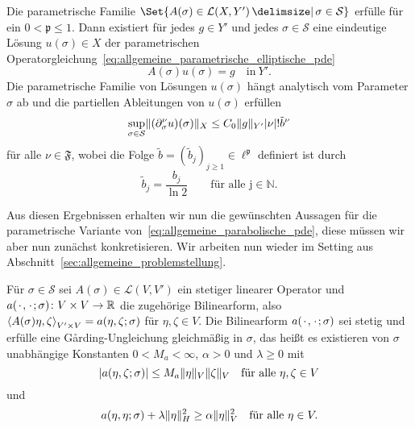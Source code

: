 \begin{Satz}
\label{thm:kunoth:theorem4}
    Die parametrische Familie $\Set{ A(\sigma) \in \mathcal L(X, Y') \given \sigma \in \mathcal S }$ erfülle  für ein $0 < \mathfrak p \leq 1$.
    Dann existiert für jedes $g \in Y'$ und jedes $\sigma \in \mathcal S$ eine eindeutige Lösung $u(\sigma) \in X$ der parametrischen Operatorgleichung~\eqref{eq:allgemeine_parametrische_elliptische_pde}
    \begin{equation}
        A(\sigma) u(\sigma) = g \quad \text{in}~Y'.
    \end{equation}
    Die parametrische Familie von Lösungen $u(\sigma)$ hängt analytisch vom Parameter $\sigma$ ab und die partiellen Ableitungen von $u(\sigma)$ erfüllen
    \begin{equation}
        \label{eq:kunoth:schranke_part_abl}
        \sup_{\sigma \in \mathcal S} \lVert(\partial^{\nu}_{\sigma} u)(\sigma)\rVert_{X} \leq C_{0} \lVert g\rVert_{Y'} \lvert\nu\rvert! \tilde{b}^{\nu}
    \end{equation}
    für alle $\nu \in \mathfrak F$, wobei die Folge $\tilde{b} = (\tilde{b}_{j})_{j \geq 1} \in \ell^{\mathfrak p}$ definiert ist durch
    \begin{equation}
        \tilde{b}_{j} = \frac{b_{j}}{\ln 2} \qquad \text{für alle j} \in \mathbb{N}.
    \end{equation}
\end{Satz}

Aus diesen Ergebnissen erhalten wir nun die gewünschten Aussagen für die parametrische Variante von~\eqref{eq:allgemeine_parabolische_pde}, diese müssen wir aber nun zunächst konkretisieren.
Wir arbeiten nun wieder im Setting aus Abschnitt~\ref{sec:allgemeine_problemstellung}.

Für $\sigma \in \mathcal S$ sei $A(\sigma) \in \mathcal L(V, V')$ ein stetiger linearer Operator und $a({\mkern2mu\cdot\mkern2mu}, {\mkern2mu\cdot\mkern2mu}; \sigma) \colon V \times V \to \mathbb{R}$ die zugehörige Bilinearform, also $\left\langle A(\sigma) \eta,\zeta\right\rangle_{V' \times V} = a(\eta, \zeta; \sigma)$ für $\eta, \zeta \in V$.
Die Bilinearform $a({\mkern2mu\cdot\mkern2mu}, {\mkern2mu\cdot\mkern2mu}; \sigma)$ sei stetig und erfülle eine G\r{a}rding-Ungleichung gleichmäßig in $\sigma$, das heißt es existieren von $\sigma$ unabhängige Konstanten $0 < M_{a} < \infty$, $\alpha > 0$ und $\lambda \geq 0$ mit
\begin{equation}
    \label{eq:allgemeine_parabolische_pde:bf_stetig_parametrisch}
    \lvert a(\eta, \zeta; \sigma)\rvert \leq M_{a} \lVert\eta\rVert_{V} \lVert\zeta\rVert_{V} \quad \text{für alle}~\eta, \zeta \in V
\end{equation}
und
\begin{equation}
    \label{eq:allgemeine_parabolische_pde:bf_garding_parametrisch}
    a(\eta, \eta; \sigma) + \lambda \lVert\eta\rVert_{H}^{2} \geq \alpha \lVert\eta\rVert_{V}^{2} \quad \text{für alle}~\eta \in V.
\end{equation}

